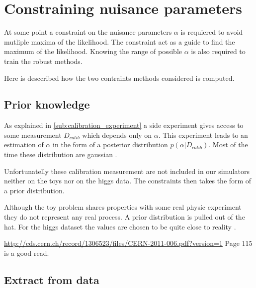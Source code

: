\section{Constraining nuisance parameters} %
\label{sec:constraining_nuisance_parameters}





At some point a constraint on the nuisance parameters $\alpha$ is requiered to avoid mutliple maxima of the likelihood.
The constraint act as a guide to find the maximum of the likelihood.
Knowing the range of possible $\alpha$ is also required to train the robust methods.

Here is desccribed how the two contraints methods considered is computed.


\subsection{Prior knowledge} %
\label{sub:prior_knowledge}


As explained in \autoref{sub:calibration_experiment} a side experiment gives access to some measurement $D_{calib}$ which depends only on $\alpha$.
This experiment leads to an estimation of $\alpha$ in the form of a posterior distribution $p(\alpha | D_{calib})$.
Most of the time these distribution are gaussian \needcite.

Unfortunatelly these calibration measurement are not included in our simulators neither on the toys nor on the higgs data.
The constraints then takes the form of a prior distribution.

Although the toy problem shares properties with some real physic experiment they do not represent any real process.
A prior distribution is pulled out of the hat.
For the higgs dataset the values are chosen to be quite close to reality \needcite.

\url{http://cds.cern.ch/record/1306523/files/CERN-2011-006.pdf?version=1} Page 115 is a good read.






\subsection{Extract from data} %
\label{sub:extract_from_data}































